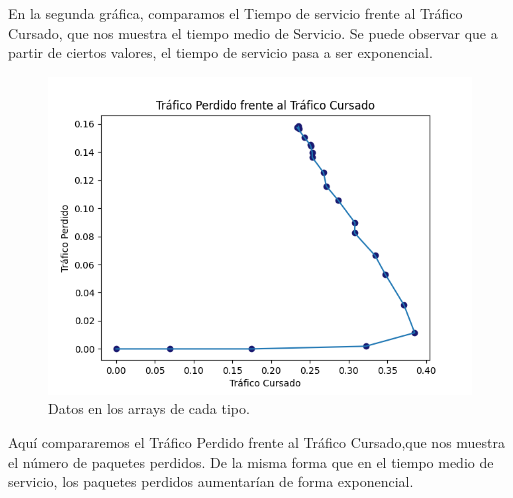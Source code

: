 \documentclass{article}
\begin{document}
En la segunda gráfica, comparamos el Tiempo de servicio frente al Tráfico Cursado, que nos muestra el tiempo medio de Servicio. Se puede observar que a partir de ciertos valores, el tiempo de servicio pasa a ser exponencial.

\begin{figure}[h]
    \centering
    \includegraphics[width=0.7\linewidth]{src/TPvsTC.png}
    \caption{\label{fig:TPvsTC} Datos en los arrays de cada tipo.}
\end{figure}

Aquí compararemos el Tráfico Perdido frente al Tráfico Cursado,que nos muestra el número de paquetes perdidos. De la misma forma que en el tiempo medio de servicio, los paquetes perdidos aumentarían de forma exponencial. 
\end{document}
